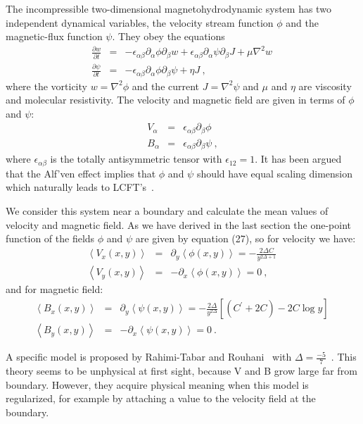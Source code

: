 The incompressible two-dimensional magnetohydrodynamic system has two
independent dynamical variables, the velocity stream function $\phi$ and
the magnetic-flux function $\psi$. They obey the equations
\begin{eqnarray}
\frac {\partial{w}}{\partial{t}}&=&-\epsilon_{\alpha\beta}\partial_{\alpha}{\phi}\partial_{\beta}{w}+\epsilon_{\alpha\beta}\partial_{\alpha}\psi\partial_{\beta}{J}+\mu\nabla^{2}w~\nonumber\\
\frac {\partial{\psi}}{\partial{t}}&=&-\epsilon_{\alpha\beta}\partial_{\alpha}{\phi}\partial_{\beta}{\psi}+\eta J~,
\end{eqnarray}
where the vorticity $w=\nabla^{2}\phi$ and the current $J=\nabla^{2}\psi$ and $\mu$ and $\eta$ are viscosity and molecular resistivity. The velocity and
magnetic field are given in terms of $\phi$ and $\psi$:
\begin{eqnarray}
V_{\alpha}&=&\epsilon_{\alpha\beta}\partial_{\beta}{\phi}~\nonumber\\
B_{\alpha}&=&\epsilon_{\alpha\beta}\partial_{\beta}{\psi}~,
\end{eqnarray}
where $\epsilon_{\alpha\beta}$ is the totally antisymmetric tensor with $\epsilon_{12}=1$.
It has been argued that the Alf'ven effect implies that $\phi$ and $\psi$ should 
have equal scaling dimension which naturally leads to LCFT's~\cite{RR,Flohr MHD}.

We consider this system near a boundary and calculate the mean values of velocity
and magnetic field. As we have derived in the last section the one-point function of the fields $\phi$ 
and $\psi$ are given by equation (27),
so for velocity we have:
\begin{eqnarray}
\left<V_{x}(x,y)\right>&=&\partial_{y}\left<\phi(x,y)\right>=-\frac {2\Delta C}{y^{2\Delta+1}}~\nonumber\\
\left<V_{y}(x,y)\right>&=&-\partial_{x}\left<\phi(x,y)\right>=0~,
\end{eqnarray}
and for magnetic field:
\begin{eqnarray} 
\left<B_{x}(x,y)\right>&=&\partial_{y}\left<\psi(x,y)\right>=-\frac {2\Delta}{y^{2\Delta}}\left[(C^{\prime}+2C)-2C\log y\right]~\nonumber\\
\left<B_{y}(x,y)\right>&=&-\partial_{x}\left<\psi(x,y)\right>=0~.
\end{eqnarray}

A specific model is proposed by Rahimi-Tabar and Rouhani~\cite{RR} with $\Delta=\frac {-5}{7}$~. 
This theory seems to be unphysical at first sight, because V and B grow
large far from boundary. However, they acquire physical meaning when this model
is regularized, for example by attaching a value to the velocity field at the boundary.

